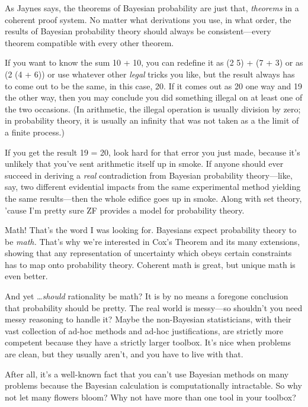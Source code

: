 {
 As Jaynes says, the theorems of Bayesian probability are just
that, \textit{theorems} in a coherent proof system. No matter what
derivations you use, in what order, the results of Bayesian probability
theory should always be consistent---every theorem compatible with
every other theorem.}

{
 If you want to know the sum 10 + 10, you can redefine it as (2
{\texttimes} 5) + (7 + 3) or as (2 {\texttimes} (4 + 6)) or use
whatever other \textit{legal} tricks you like, but the result always
has to come out to be the same, in this case, 20. If it comes out as 20
one way and 19 the other way, then you may conclude you did something
illegal on at least one of the two occasions. (In arithmetic, the
illegal operation is usually division by zero; in probability theory,
it is usually an infinity that was not taken as a the limit of a finite
process.)}

{
 If you get the result 19 = 20, look hard for that error you just
made, because it's unlikely that you've
sent arithmetic itself up in smoke. If anyone should ever succeed in
deriving a \textit{real} contradiction from Bayesian probability
theory---like, say, two different evidential impacts from the same
experimental method yielding the same results---then the whole edifice
goes up in smoke. Along with set theory, 'cause
I'm pretty sure \textsf{ZF} provides a model for probability
theory.}

{
 Math! That's the word I was looking for. Bayesians
expect probability theory to be \textit{math.} That's
why we're interested in Cox's Theorem
and its many extensions, showing that any representation of uncertainty
which obeys certain constraints has to map onto probability theory.
Coherent math is great, but unique math is even better.}

{
 And yet \ldots \textit{should} rationality be math? It is by no
means a foregone conclusion that probability should be pretty. The real
world is messy---so shouldn't you need messy reasoning
to handle it? Maybe the non-Bayesian statisticians, with their vast
collection of ad-hoc methods and ad-hoc justifications, are strictly
more competent because they have a strictly larger toolbox.
It's nice when problems are clean, but they usually
aren't, and you have to live with that.}

{
 After all, it's a well-known fact that you
can't use Bayesian methods on many problems because the
Bayesian calculation is computationally intractable. So why not let
many flowers bloom? Why not have more than one tool in your toolbox?}

